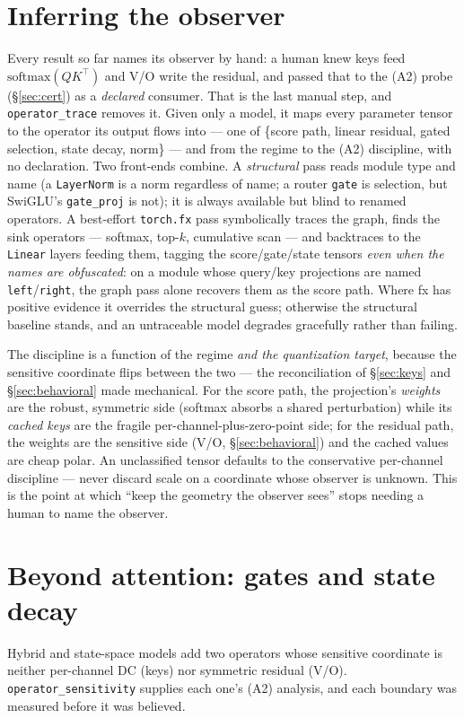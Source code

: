 \documentclass[11pt]{article}
\begin{document}
\section{Inferring the observer}\label{sec:infer}
Every result so far names its observer by hand: a human knew keys feed
$\mathrm{softmax}(QK^\top)$ and V/O write the residual, and passed that to the
(A2) probe (\S\ref{sec:cert}) as a \emph{declared} consumer. That is the last
manual step, and \texttt{operator\_trace} removes it. Given only a model, it
maps every parameter tensor to the operator its output flows into --- one of
\{score path, linear residual, gated selection, state decay, norm\} --- and from
the regime to the (A2) discipline, with no declaration. Two front-ends combine.
A \emph{structural} pass reads module type and name (a \texttt{LayerNorm} is a
norm regardless of name; a router \texttt{gate} is selection, but SwiGLU's
\texttt{gate\_proj} is not); it is always available but blind to renamed
operators. A best-effort \texttt{torch.fx} pass symbolically traces the graph,
finds the sink operators --- softmax, top-$k$, cumulative scan --- and
backtraces to the \texttt{Linear} layers feeding them, tagging the
score/gate/state tensors \emph{even when the names are obfuscated}: on a module
whose query/key projections are named \texttt{left}/\texttt{right}, the graph
pass alone recovers them as the score path. Where fx has positive evidence it
overrides the structural guess; otherwise the structural baseline stands, and an
untraceable model degrades gracefully rather than failing.

The discipline is a function of the regime \emph{and the quantization target},
because the sensitive coordinate flips between the two --- the reconciliation of
\S\ref{sec:keys} and \S\ref{sec:behavioral} made mechanical. For the score path,
the projection's \emph{weights} are the robust, symmetric side (softmax absorbs
a shared perturbation) while its \emph{cached keys} are the fragile
per-channel-plus-zero-point side; for the residual path, the weights are the
sensitive side (V/O, \S\ref{sec:behavioral}) and the cached values are cheap
polar. An unclassified tensor defaults to the conservative per-channel
discipline --- never discard scale on a coordinate whose observer is unknown.
This is the point at which ``keep the geometry the observer sees'' stops needing
a human to name the observer.

\section{Beyond attention: gates and state decay}\label{sec:hybrid}
Hybrid and state-space models add two operators whose sensitive coordinate is
neither per-channel DC (keys) nor symmetric residual (V/O).
\texttt{operator\_sensitivity} supplies each one's (A2) analysis, and each
boundary was measured before it was believed.
\end{document}
